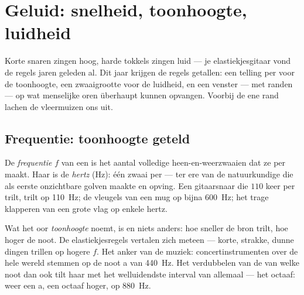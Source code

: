 \chapter{Geluid: snelheid, toonhoogte, luidheid}\label{ch:g8:sound-pitch-loudness}

Korte snaren zingen hoog, harde tokkels zingen luid --- je
elastiekjesgitaar vond de regels jaren geleden al. Dit jaar krijgen de
regels getallen: een telling per  voor de toonhoogte, een
zwaaigrootte voor de luidheid, en een venster --- met randen --- op wat
menselijke oren überhaupt kunnen opvangen. Voorbij de ene rand lachen
de vleermuizen ons uit.

\section{Frequentie: toonhoogte geteld}

\begin{definition}[Frequentie]\label{def:g8:sound-pitch-loudness:frequency}
De \emph{frequentie} $f$ van een
 is het aantal volledige heen-en-weerzwaaien dat ze per
 maakt. Haar  is de \emph{hertz}
(\unit{Hz}): één zwaai per  --- ter ere van de natuurkundige die
als eerste onzichtbare golven maakte en opving. Een gitaarsnaar die
$110$ keer per  trilt, trilt op \qty{110}{Hz}; de vleugels van
een mug op bijna \qty{600}{Hz}; het trage klapperen van een grote vlag
op enkele hertz.
\end{definition}

\begin{proposition}\label{prop:g8:sound-pitch-loudness:pitch}
Wat het oor \emph{toonhoogte} noemt, is
 en niets anders: hoe sneller de bron trilt, hoe
hoger de noot. De elastiekjesregels vertalen zich meteen --- korte,
strakke, dunne dingen trillen op hogere $f$. Het anker van de muziek:
concertinstrumenten over de hele wereld stemmen op de noot a van
\qty{440}{Hz}. Het verdubbelen van de  van welke noot
dan ook tilt haar met het welluidendste interval van allemaal --- het
octaaf: weer een a, een octaaf hoger, op \qty{880}{Hz}.
\end{proposition}

